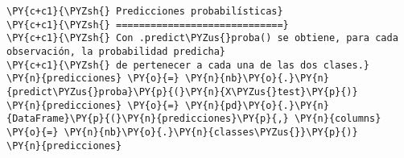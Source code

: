     \begin{tcolorbox}[breakable, size=fbox, boxrule=1pt, pad at break*=1mm,colback=cellbackground, colframe=cellborder]
\begin{Verbatim}[commandchars=\\\{\}]
\PY{c+c1}{\PYZsh{} Predicciones probabilísticas}
\PY{c+c1}{\PYZsh{} =============================}
\PY{c+c1}{\PYZsh{} Con .predict\PYZus{}proba() se obtiene, para cada observación, la probabilidad predicha}
\PY{c+c1}{\PYZsh{} de pertenecer a cada una de las dos clases.}
\PY{n}{predicciones} \PY{o}{=} \PY{n}{nb}\PY{o}{.}\PY{n}{predict\PYZus{}proba}\PY{p}{(}\PY{n}{X\PYZus{}test}\PY{p}{)}
\PY{n}{predicciones} \PY{o}{=} \PY{n}{pd}\PY{o}{.}\PY{n}{DataFrame}\PY{p}{(}\PY{n}{predicciones}\PY{p}{,} \PY{n}{columns} \PY{o}{=} \PY{n}{nb}\PY{o}{.}\PY{n}{classes\PYZus{}}\PY{p}{)}
\PY{n}{predicciones}
\end{Verbatim}
\end{tcolorbox}

\begin{table}[H]
\centering
\setlength{\tabcolsep}{5pt}
\caption{Predicciones probabilísticas para cada observación Bayes}
\label{tab:probabilistica Bayes}
\end{table}
        
